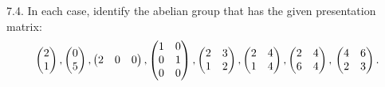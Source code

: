 \documentclass[10pt]{scrartcl}
\begin{document}
\begin{problem*}7.4.
	In each case, identify the abelian group
	that has the given presentation matrix:
	\[\begin{pmatrix}
		2\\1
	\end{pmatrix}, \begin{pmatrix}
		0\\5
	\end{pmatrix},
\begin{pmatrix}
	2&0&0
\end{pmatrix},
\begin{pmatrix}
	1&0\\0&1\\0&0
\end{pmatrix},
\begin{pmatrix}
	2&3\\1&2
\end{pmatrix},
\begin{pmatrix}
	2&4\\1&4
\end{pmatrix},
\begin{pmatrix}
	2&4\\6&4
\end{pmatrix},\\
\begin{pmatrix}
	4&6\\2&3
\end{pmatrix}.\]
\end{problem*}
\end{document}
